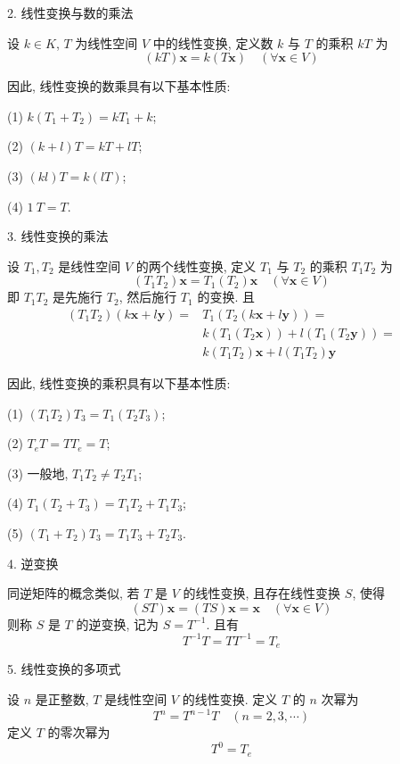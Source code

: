 \par{2. 线性变换与数的乘法}

\par 设 $k \in K$, $T$ 为线性空间 $V$ 中的线性变换, 定义数 $k$ 与 $T$ 的乘积 $kT$ 为
$$
    (kT)\bm{x} = k(T\bm{x}) \quad (\forall \bm{x} \in V)
$$

\par 因此, 线性变换的数乘具有以下基本性质:
\par (1) $k(T_1 + T_2) = kT_1 + k$;
\par (2) $(k + l)T = kT + lT$;
\par (3) $(kl)T= k(lT)$;
\par (4) $1\ T = T$.

\par{3. 线性变换的乘法}

\par 设 $T_1, T_2$ 是线性空间 $V$ 的两个线性变换, 定义 $T_1$ 与 $T_2$ 的乘积 $T_1T_2$ 为
$$
    (T_1T_2)\bm{x} = T_1(T_2)\bm{x} \quad (\forall \bm{x} \in V)
$$
即 $T_1T_2$ 是先施行 $T_2$, 然后施行 $T_1$ 的变换. 且
\begin{align*}
    (T_1T_2)(k\bm{x} + l\bm{y}) = & T_1(T_2(k\bm{x} + l\bm{y})) =           \\
                                  & k(T_1(T_2\bm{x})) + l(T_1(T_2\bm{y})) = \\
                                  & k(T_1T_2)\bm{x} + l(T_1T_2)\bm{y}
\end{align*}

\par 因此, 线性变换的乘积具有以下基本性质:
\par (1) $(T_1T_2)T_3 = T_1(T_2T_3)$;
\par (2) $T_eT = TT_e = T$;
\par (3) 一般地, $T_1T_2 \neq T_2T_1$;
\par (4) $T_1(T_2 + T_3) = T_1T_2 + T_1T_3$;
\par (5) $(T_1 + T_2)T_3 = T_1T_3 + T_2T_3$.

\par{4. 逆变换}

\par 同逆矩阵的概念类似, 若 $T$ 是 $V$ 的线性变换, 且存在线性变换 $S$, 使得
$$
    (ST)\bm{x} = (TS)\bm{x} = \bm{x} \quad (\forall \bm{x} \in V)
$$
则称 $S$ 是 $T$ 的逆变换, 记为 $S = T^{-1}$. 且有
$$
    T^{-1}T = TT^{-1} = T_e
$$

\par{5. 线性变换的多项式}

\par 设 $n$ 是正整数, $T$ 是线性空间 $V$ 的线性变换. 定义 $T$ 的 $n$ 次幂为
$$
    T^n = T^{n-1}T \quad (n = 2,3,\cdots)
$$
定义 $T$ 的零次幂为
$$
    T^0 = T_e
$$

